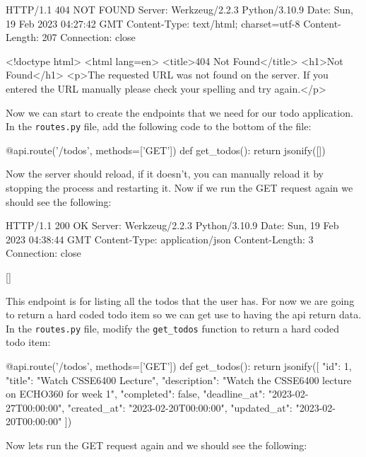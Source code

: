 \documentclass{csse4400}
\begin{document}
\begin{code}[language=html,numbers=none]{}
  HTTP/1.1 404 NOT FOUND
  Server: Werkzeug/2.2.3 Python/3.10.9
  Date: Sun, 19 Feb 2023 04:27:42 GMT
  Content-Type: text/html; charset=utf-8
  Content-Length: 207
  Connection: close
  
  <!doctype html>
  <html lang=en>
  <title>404 Not Found</title>
  <h1>Not Found</h1>
  <p>The requested URL was not found on the server. If you entered the URL manually please check your spelling and try again.</p>  
\end{code}

Now we can start to create the endpoints that we need for our todo application. In the \texttt{routes.py} file, add the following code to the bottom of the file:

\begin{code}[language=python]{}
  @api.route('/todos', methods=['GET'])
  def get_todos():
      return jsonify([])
\end{code}

Now the server should reload, if it doesn't, you can manually reload it by stopping the process and restarting it. Now if we run the GET request again we should see the following:

\begin{code}[language=json,numbers=none]{}
  HTTP/1.1 200 OK
  Server: Werkzeug/2.2.3 Python/3.10.9
  Date: Sun, 19 Feb 2023 04:38:44 GMT
  Content-Type: application/json
  Content-Length: 3
  Connection: close
  
  []
\end{code}

This endpoint is for listing all the todos that the user has. For now we are going to return a hard coded todo item so we can get use to having the api return data. In the \texttt{routes.py} file, modify the \texttt{get\_todos} function to return a hard coded todo item:

\begin{code}[language=python]{}
  @api.route('/todos', methods=['GET'])
  def get_todos():
      return jsonify([{
        "id": 1,
        "title": "Watch CSSE6400 Lecture",
        "description": "Watch the CSSE6400 lecture on ECHO360 for week 1",
        "completed": false,
        "deadline_at": "2023-02-27T00:00:00",
        "created_at": "2023-02-20T00:00:00",
        "updated_at": "2023-02-20T00:00:00"
      }])
\end{code}

Now lets run the GET request again and we should see the following:
\end{document}
